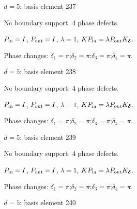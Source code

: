 {\Large $d=5$: basis element 237}\par
No boundary support. 4 phase defects.
\begin{center}
\end{center}
\vspace{-1mm}
$P_{\rm in}=I$, \quad $P_{\rm out}=I$, \quad $\lambda=1$, \qquad $K P_{\rm in}=\lambda P_{\rm out}K_{\boldsymbol\delta}$.
\par\smallskip\begin{minipage}{.98\linewidth}\small Phase changes: $\delta_{1}=\pi$;\quad $\delta_{2}=\pi$;\quad $\delta_{3}=\pi$;\quad $\delta_{4}=\pi$.\end{minipage}
\vfill
{\footnotesize\texttt{}}
\newpage
{}
{\Large $d=5$: basis element 238}\par
No boundary support. 4 phase defects.
\begin{center}
\end{center}
\vspace{-1mm}
$P_{\rm in}=I$, \quad $P_{\rm out}=I$, \quad $\lambda=1$, \qquad $K P_{\rm in}=\lambda P_{\rm out}K_{\boldsymbol\delta}$.
\par\smallskip\begin{minipage}{.98\linewidth}\small Phase changes: $\delta_{1}=\pi$;\quad $\delta_{2}=\pi$;\quad $\delta_{3}=\pi$;\quad $\delta_{4}=\pi$.\end{minipage}
\vfill
{\footnotesize\texttt{}}
\newpage
{}
{\Large $d=5$: basis element 239}\par
No boundary support. 4 phase defects.
\begin{center}
\end{center}
\vspace{-1mm}
$P_{\rm in}=I$, \quad $P_{\rm out}=I$, \quad $\lambda=1$, \qquad $K P_{\rm in}=\lambda P_{\rm out}K_{\boldsymbol\delta}$.
\par\smallskip\begin{minipage}{.98\linewidth}\small Phase changes: $\delta_{1}=\pi$;\quad $\delta_{2}=\pi$;\quad $\delta_{3}=\pi$;\quad $\delta_{4}=\pi$.\end{minipage}
\vfill
{\footnotesize\texttt{}}
\newpage
{}
{\Large $d=5$: basis element 240}\par

